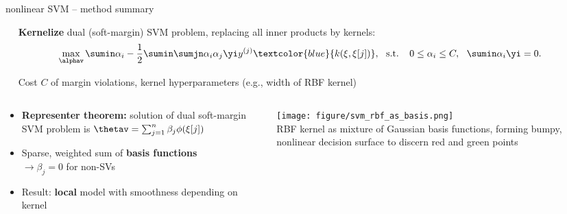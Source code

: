 \begin{frame}{nonlinear SVM -- method summary}

\footnotesize

 ~~ \textbf{Kernelize} dual (soft-margin) SVM problem, 
replacing all inner products by kernels:
$$\max_{\alphav} \sumin \alpha_i - \frac{1}{2}\sumin \sumjn
\alpha_i\alpha_j\yi y^{(j)} \textcolor{blue}{k(\xi, \xi[j])}, ~~ \text{s.t. } ~~ 
0 \le \alpha_i \le C, ~~ \sumin \alpha_i \yi = 0.
$$

\medskip

 ~~ Cost $C$ of margin violations, kernel 
hyperparameters (e.g., width of RBF kernel)

\medskip

\begin{columns}[T, totalwidth=\textwidth]
    \begin{column}{0.59\textwidth}
        
  \begin{itemize}
    \item \textbf{Representer theorem:} solution of dual soft-margin SVM problem is
    $\thetav = \sum_{j=1}^n \beta_j \phi (\xi[j] )$ \\
    \item Sparse, weighted sum of \textbf{basis functions}\\
    $\rightarrow \beta_j = 0$ 
    for non-SVs
    \item Result: \textbf{local} model with smoothness depending on kernel
  \end{itemize}
    \end{column}
        \begin{column}{0.4\textwidth}
        \centering
  \texttt{[image: 
  figure/svm\_rbf\_as\_basis.png]} \\
  \tiny{RBF kernel as mixture of Gaussian basis functions, forming
  bumpy, nonlinear decision surface to discern red and green points}
    \end{column}
\end{columns}

\end{frame}


